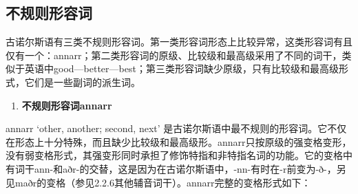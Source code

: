\subsection{不规则形容词}\label{不规则形容词}

古诺尔斯语有三类不规则形容词。第一类形容词形态上比较异常，这类形容词有且仅有一个：annarr；第二类形容词的原级、比较级和最高级采用了不同的词干，类似于英语中good---better---best；第三类形容词缺少原级，只有比较级和最高级形式，它们是一些副词的派生词。

\begin{enumerate}
  \def\labelenumi{\arabic{enumi})}
  \item
        \textbf{不规则形容词annarr}
\end{enumerate}

annarr `other, another; second, next‌'
是古诺尔斯语中最不规则的形容词。它不仅在形态上十分特殊，而且缺少比较级和最高级形。annarr只按原级的强变格变形，没有弱变格形式，其强变形同时承担了修饰特指和非特指名词的功能。它的变格中有词干ann-和aðr-的交替，这是因为在古诺尔斯语中，-nn-有时在-r前变为-ð-，另见maðr的变格（参见2.2.6其他辅音词干）。annarr完整的变格形式如下：

